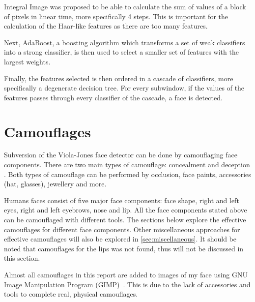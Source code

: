 \documentclass[10pt,twocolumn,letterpaper]{article}
\begin{document}
Integral Image was proposed to be able to calculate the sum of values of a block of pixels in linear time, more specifically 4 steps. This is important for the calculation of the Haar-like features as there are too many features.

Next, AdaBoost, a boosting algorithm which transforms a set of weak classifiers into a strong classifier, is then used to select a smaller set of features with the largest weights.

Finally, the features selected is then ordered in a cascade of classifiers, more specifically a degenerate decision tree. For every subwindow, if the values of the features passes through every classifier of the cascade, a face is detected.


\section{Camouflages}


Subversion of the Viola-Jones face detector can be done by camouflaging face components. There are two main types of camouflage: concealment and deception \cite{facilitating-fashion-camouflage-art}. Both types of camouflage can be performed by occlusion, face paints, accessories (hat, glasses), jewellery and more.

Humans faces consist of five major face components: face shape, right and left eyes, right and left eyebrows, nose and lip. All the face components stated above can be camouflaged with different tools. The sections below explore the effective camouflages for different face components. Other miscellaneous approaches for effective camouflages will also be explored in \cref{sec:miscellaneous}. It should be noted that camouflages for the lips was not found, thus will not be discussed in this section.

Almost all camouflages in this report are added to images of my face using GNU Image Manipulation Program (GIMP)~\cite{gimp}. This is due to the lack of accessories and tools to complete real, physical camouflages.

\end{document}
